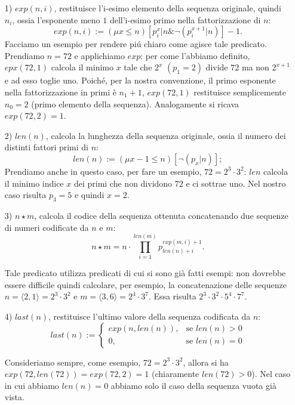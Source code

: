 \begin{itemize}
\item[1)] {$exp(n,i)$, restituisce l'i-esimo elemento della sequenza originale, quindi $n_i$, ossia l'esponente meno $1$ dell'i-esimo primo nella fat\-to\-riz\-za\-zio\-ne di $n$: $$exp(n,i) := (\mu x \leq n){ [p_{i}^{x}|n \& \neg (p_i^{x+1}|n)]-1.}$$
   Facciamo un esempio per rendere pi\'u chiaro come agisce tale predicato. Prendiamo $n=72$ e applichiamo $exp$:
per come l'abbiamo definito, $epx(72,1)$ calcola il minimo $x$ tale che $2^x$ $(p_1=2)$ divide $72$ ma non $2^{x+1}$ e ad esso toglie uno. Poich\'e, per la nostra convenzione, il primo esponente nella fattorizzazione in primi \`e $n_1+1$, $exp(72,1)$ restituisce semplicemente $n_0=2$ (primo elemento della sequenza). Analogamente si ricava $exp(72,2)=1$.}

\item[2)] $len(n)$, calcola la lunghezza della sequenza originale, ossia il numero dei distinti fattori primi di $n$:
    $$len(n):= (\mu x -1 \leq n )[\neg (p_x|n)];$$
    Prendiamo anche in questo caso, per fare un esempio, $72=2^3\cdot3^2$: $len$ calcola il minimo indice $x$ dei primi che non dividono $72$ e ci sottrae uno. Nel nostro caso risulta $p_3=5$ e quindi $x=2$.

\item[3)] $n\star m$, calcola il codice della sequenza ottenuta concatenando due sequenze di numeri codificate da $n$ e $m$: $$n\star m= n\cdot \prod_{i=1}^{len(m)} p_{len(n)+i}^{exp(m,i)+1}.$$


Tale predicato utilizza predicati di cui si sono gi\`a fatti esempi: non dovrebbe essere difficile quindi calcolare, per esempio, la concatenazione delle sequenze $n=\langle 2, 1\rangle = 2^3\cdot 3^2 $ e $m=\langle 3, 6\rangle = 2^4\cdot 3^7$. Essa risulta $2^3\cdot 3^2\cdot 5^4 \cdot 7^7$.

\item[4)] $last(n)$, restituisce l'ultimo valore della sequenza codificata da $n$:
$$last(n) := \left\{
\begin{array}{ll}
exp(n,len(n)), & \textrm{se $len(n)> 0$} \\
0, & \textrm{se $len(n)= 0$}
\end{array}
\right.$$

Consideriamo sempre, come esempio, $72=2^3\cdot 3^2$, allora si ha $exp(72, len(72)) = exp(72,2) = 1$ (chiaramente $len(72)>0$).
Nel caso in cui abbiamo $len(n)=0$ abbiamo solo il caso della sequenza vuota gi\`a vista.
\end{itemize}



